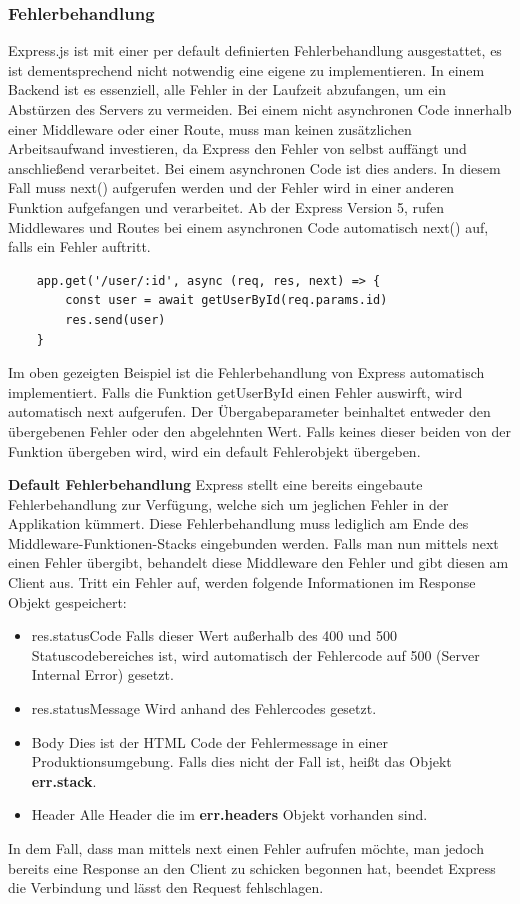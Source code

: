 \subsubsection{Fehlerbehandlung}
Express.js ist mit einer per default definierten Fehlerbehandlung ausgestattet, es ist dementsprechend nicht notwendig eine eigene zu implementieren. In einem Backend ist es essenziell, alle Fehler in der Laufzeit abzufangen, um ein Abstürzen des Servers zu vermeiden. Bei einem nicht asynchronen Code innerhalb einer Middleware oder einer Route, muss man keinen zusätzlichen Arbeitsaufwand investieren, da Express den Fehler von selbst auffängt und anschließend verarbeitet. Bei einem asynchronen Code ist dies anders. In diesem Fall muss next() aufgerufen werden und der Fehler wird in einer anderen Funktion aufgefangen und verarbeitet. Ab der Express Version 5, rufen Middlewares und Routes bei einem asynchronen Code automatisch next() auf, falls ein Fehler auftritt.
\begin{lstlisting}
    app.get('/user/:id', async (req, res, next) => {
        const user = await getUserById(req.params.id)
        res.send(user)
    }
\end{lstlisting}
Im oben gezeigten Beispiel ist die Fehlerbehandlung von Express automatisch implementiert. Falls die Funktion getUserById einen Fehler auswirft, wird automatisch next aufgerufen. Der Übergabeparameter beinhaltet entweder den übergebenen Fehler oder den abgelehnten Wert. Falls keines dieser beiden von der Funktion übergeben wird, wird ein default Fehlerobjekt übergeben.

\textbf{Default Fehlerbehandlung}
\newline
Express stellt eine bereits eingebaute Fehlerbehandlung zur Verfügung, welche sich um jeglichen Fehler in der Applikation kümmert. Diese Fehlerbehandlung muss lediglich am Ende des Middleware-Funktionen-Stacks eingebunden werden. Falls man nun mittels next einen Fehler übergibt, behandelt diese Middleware den Fehler und gibt diesen am Client aus. Tritt ein Fehler auf, werden folgende Informationen im Response Objekt gespeichert:
\begin{itemize}
    \item res.statusCode
        \newline
        Falls dieser Wert außerhalb des 400 und 500 Statuscodebereiches ist, wird automatisch der Fehlercode auf 500 (Server Internal Error) gesetzt.
    \item res.statusMessage
        \newline
        Wird anhand des Fehlercodes gesetzt.
    \item Body
        \newline
        Dies ist der HTML Code der Fehlermessage in einer Produktionsumgebung. Falls dies nicht der Fall ist, heißt das Objekt \textbf{err.stack}.
    \item Header
        \newline
        Alle Header die im \textbf{err.headers} Objekt vorhanden sind.
\end{itemize}
In dem Fall, dass man mittels next einen Fehler aufrufen möchte, man jedoch bereits eine Response an den Client zu schicken begonnen hat, beendet Express die Verbindung und lässt den Request fehlschlagen.

